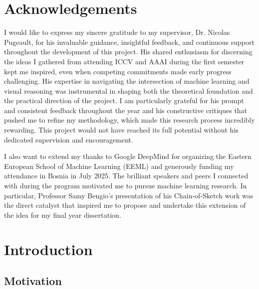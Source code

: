 \documentclass{l4proj}
\begin{document}
\chapter*{Acknowledgements}
I would like to express my sincere gratitude to my supervisor, Dr. Nicolas Pugeault, for his invaluable guidance, insightful feedback, and continuous support throughout the development of this project. His shared enthusiasm for discerning the ideas I gathered from attending ICCV and AAAI during the first semester kept me inspired, even when competing commitments made early progress challenging. His expertise in navigating the intersection of machine learning and visual reasoning was instrumental in shaping both the theoretical foundation and the practical direction of the project. I am particularly grateful for his prompt and consistent feedback throughout the year and his constructive critiques that pushed me to refine my methodology, which made this research process incredibly rewarding. This project would not have reached its full potential without his dedicated supervision and encouragement.

I also want to extend my thanks to Google DeepMind for organizing the Eastern European School of Machine Learning (EEML) and generously funding my attendance in Bosnia in July 2025. The brilliant speakers and peers I connected with during the program motivated me to pursue machine learning research. In particular, Professor Samy Bengio's presentation of his Chain-of-Sketch work was the direct catalyst that inspired me to propose and undertake this extension of the idea for my final year dissertation.

\def\consentname{Mariia Baidachna}
\def\consentdate{\today}
\educationalconsent


\tableofcontents

\chapter{Introduction}

\section{Motivation}
\end{document}
